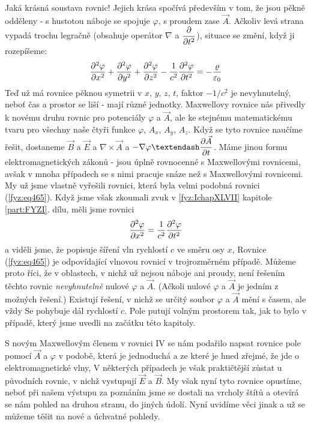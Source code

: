 {  Jaká krásná soustava rovnic! Jejich krása spočívá především v tom, že jsou pěkně odděleny - s 
  hustotou náboje se spojuje \(\varphi\), s proudem zase \(\vec{A}\). Ačkoliv levá strana vypadá 
  trochu legračně (obsahuje operátor \(\nabla\) a \(\dfrac{\partial }{\partial t^2}\)), situace se změní, když ji 
  rozepíšeme:
  \begin{equation}\label{fyz:eq465}
    \dfrac{\partial^2 \varphi}{\partial x^2} + \dfrac{\partial^2 \varphi}{\partial y^2} + \dfrac{\partial^2 \varphi}{\partial z^2} - \frac{1}{c^2}\dfrac{\partial^2 \varphi}{\partial t^2}
      = - \frac{\varrho}{\varepsilon_0}
  \end{equation} 
  Teď už má rovnice pěknou symetrii v \(x\), \(y\), \(z\), \(t\), faktor \(-1/c^2\) je 
  nevyhnutelný, neboť čas a prostor se liší - mají různé jednotky. Maxwellovy rovnice nás přivedly 
  k novému druhu rovnic pro potenciály \(\varphi\) a \(\vec{A}\), ale ke stejnému matematickému 
  tvaru pro všechny naše čtyři funkce \(\varphi\), \(A_x\), \(A_y\), \(A_z\). Když se tyto rovnice 
  naučíme řešit, dostaneme \(\vec{B}\) a \(\vec{E}\) a \(\nabla\times\vec{A}\) a \(-\nabla\varphi – 
  \pder{\vec{A}}{t}\). Máme jinou formu elektromagnetických zákonů - jsou úplně rovnocenné s 
  Maxwellovými rovnicemi, avšak v mnoha případech se s nimi pracuje snáze než s Maxwellovými 
  rovnicemi. My už jsme vlastně vyřešili rovnici, která byla velmi podobná rovnici 
  (\ref{fyz:eq465}). Když jsme však zkoumali zvuk v \ref{fyz:IchapXLVII} kapitole \ref{part:FYZI}. 
  dílu, měli jsme rovnici
  \begin{equation*}
    \dfrac{\partial^2 \varphi}{\partial x^2} = \frac{1}{c^2}\dfrac{\partial^2 \varphi}{\partial t^2}
  \end{equation*} 
  a viděli jsme, že popisuje šíření vln rychlostí \(c\) ve směru osy \(x\), Rovnice 
  (\ref{fyz:eq465}) je odpovídající vlnovou rovnicí v trojrozměrném případě. Můžeme proto říci, že 
  v oblastech, v nichž už nejsou náboje ani proudy, není řešením těchto rovnic \emph{nevyhnutelně} 
  nulové \(\varphi\) a \(\vec{A}\). (Ačkoli nulové \(\varphi\) a \(\vec{A}\) je jedním z možných 
  řešení.) Existují řešení, v nichž se určitý soubor \(\varphi\) a \(\vec{A}\) mění s časem, ale 
  vždy Se pohybuje dál rychlostí \(c\). Pole putují volným prostorem tak, jak to bylo v případě, 
  který jsme uvedli na začátku této kapitoly.
  
  S novým Maxwellovým členem v rovnici IV se nám podařilo napsat rovnice pole pomocí \(\vec{A}\) a 
  \(\varphi\) v podobě, která je jednoduchá a ze které je hned zřejmé, že jde o elektromagnetické 
  vlny, V některých případech je však praktičtější zůstat u původních rovnic, v nichž vystupují 
  \(\vec{E}\) a \(\vec{B}\). My však nyní tyto rovnice opustíme, neboť při našem výstupu za 
  poznáním jsme se dostali na vrcholy štítů a otevírá se nám pohled na druhou stranu, do jiných 
  údolí. Nyní uvidíme věci jinak a už se můžeme těšit na nové a úchvatné pohledy.

  
} %
\printbibliography[title={Seznam literatury}, heading=subbibliography]
